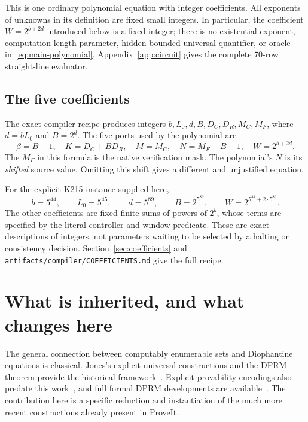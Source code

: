 \documentclass[11pt]{article}
\theoremstyle{definition}
\begin{document}
This is one ordinary polynomial equation with integer coefficients. All
exponents of unknowns in its definition are fixed small integers. In
particular, the coefficient $W=2^{b+2d}$ introduced below is a fixed integer;
there is no existential exponent, computation-length parameter, hidden
bounded universal quantifier, or oracle in~\eqref{eq:main-polynomial}.
Appendix~\ref{app:circuit} gives the complete 70-row straight-line evaluator.

\subsection{The five coefficients}

The exact compiler recipe produces integers $b,L_0,d,B,D_C,D_R,M_C,M_F$,
where $d=bL_0$ and $B=2^d$. The five ports used by the polynomial are
\begin{equation}\label{eq:five-coefficients}
 \boxed{
 \beta=B-1,\quad K=D_C+BD_R,\quad M=M_C,\quad
 N=M_F+B-1,\quad W=2^{b+2d}.}
\end{equation}
The $M_F$ in this formula is the native verification mask. The polynomial's
$N$ is its \emph{shifted} source value. Omitting this shift gives a different
and unjustified equation.

For the explicit K215 instance supplied here,
\[
 b=5^{44},\qquad L_0=5^{45},\qquad d=5^{89},
 \qquad B=2^{5^{89}},
 \qquad W=2^{5^{44}+2\cdot5^{89}}.
\]
The other coefficients are fixed finite sums of powers of $2^b$, whose
terms are specified by the literal controller and window predicate. These
are exact descriptions of integers, not parameters waiting to be selected
by a halting or consistency decision. Section~\ref{sec:coefficients} and
\texttt{artifacts/compiler/COEFFICIENTS.md} give the full recipe.

\section{What is inherited, and what changes here}

The general connection between computably enumerable sets and Diophantine
equations is classical. Jones's explicit universal constructions and the
DPRM theorem provide the historical framework~\cite{Jones1980,Jones1982}.
Explicit provability encodings also predate this work~\cite{CarlMoroz},
and full formal DPRM developments are available~\cite{FormalDPRM}.
The contribution here is a specific reduction and instantiation of the
much more recent constructions already present in ProveIt.
\end{document}

